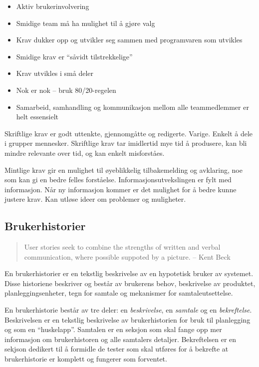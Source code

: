 \begin{itemize}
\item
  Aktiv brukerinvolvering
\item
  Smidige team må ha mulighet til å gjøre valg
\item
  Krav dukker opp og utvikler seg sammen med programvaren som utvikles
\item
  Smidige krav er ``såvidt tilstrekkelige''
\item
  Krav utvikles i små deler
\item
  Nok er nok -- bruk 80/20-regelen
\item
  Samarbeid, samhandling og kommunikasjon mellom alle teammedlemmer er
  helt essensielt
\end{itemize}
Skriftlige krav er godt uttenkte, gjennomgåtte og redigerte. Varige.
Enkelt å dele i grupper mennesker. Skriftlige krav tar imidlertid mye
tid å produsere, kan bli mindre relevante over tid, og kan enkelt
misforståes.

Mintlige krav gir en mulighet til øyeblikkelig tilbakemelding og
avklaring, noe som kan gi en bedre felles forståelse.
Informasjonsutvekslingen er fylt med informasjon. Når ny informasjon
kommer er det mulighet for å bedre kunne justere krav. Kan utløse ideer
om problemer og muligheter.

\subsection{Brukerhistorier}

\begin{quote}
User stories seek to combine the strengths of written and verbal
communication, where possible suppoted by a picture. -- Kent Beck

\end{quote}
En brukerhistorier er en tekstlig beskrivelse av en hypotetisk bruker av
systemet. Disse historiene beskriver og består av brukerens behov,
beskrivelse av produktet, planleggingsenheter, tegn for samtale og
mekanismer for samtaleutsettelse.

En brukerhistorie består av tre deler: en \emph{beskrivelse}, en
\emph{samtale} og en \emph{bekreftelse}. Beskrivelsen er en tekstlig
beskrivelse av brukerhistorien for bruk til planlegging og som en
``huskelapp''. Samtalen er en seksjon som skal fange opp mer informasjon
om brukerhistoren og alle samtalers detaljer. Bekreftelsen er en sekjson
dedikert til å formidle de tester som skal utføres for å bekrefte at
brukerhistorie er komplett og fungerer som forventet.

